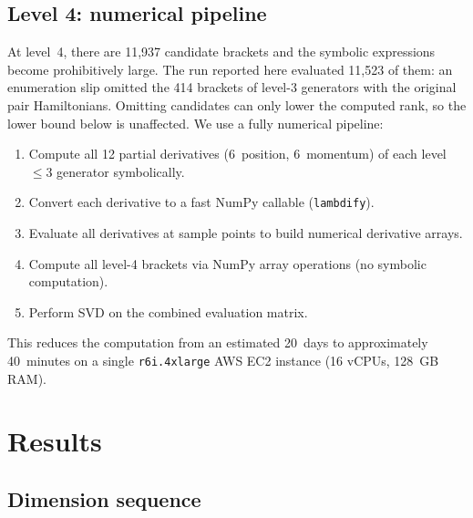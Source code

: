 \documentclass[11pt,a4paper]{article}
\theoremstyle{remark}
\begin{document}
\subsection{Level 4: numerical pipeline}

At level~4, there are 11,937 candidate brackets and the symbolic
expressions become prohibitively large.  The run reported here
evaluated 11,523 of them: an enumeration slip omitted the 414
brackets of level-3 generators with the original pair
Hamiltonians.  Omitting candidates can only lower the computed
rank, so the lower bound below is unaffected.  We use a fully
numerical pipeline:
\begin{enumerate}[nosep]
  \item Compute all 12 partial derivatives (6~position,
        6~momentum) of each level~$\le 3$ generator symbolically.
  \item Convert each derivative to a fast NumPy callable
        (\texttt{lambdify}).
  \item Evaluate all derivatives at sample points to build
        numerical derivative arrays.
  \item Compute all level-4 brackets via NumPy array operations
        (no symbolic computation).
  \item Perform SVD on the combined evaluation matrix.
\end{enumerate}
This reduces the computation from an estimated 20~days to
approximately 40~minutes on a single \texttt{r6i.4xlarge}
AWS EC2 instance (16 vCPUs, 128~GB RAM).


\section{Results}

\subsection{Dimension sequence}
\end{document}
